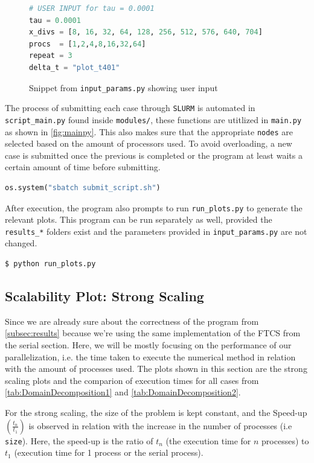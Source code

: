 \begin{figure}[H]
\begin{lstlisting}[language=Python]
# USER INPUT for tau = 0.0001
tau = 0.0001
x_divs = [8, 16, 32, 64, 128, 256, 512, 576, 640, 704]
procs  = [1,2,4,8,16,32,64]
repeat = 3
delta_t = "plot_t401"
\end{lstlisting}
\caption{Snippet from \texttt{input\_params.py} showing user input}
\label{fig:inputparams}
\end{figure}

The process of submitting each case through \texttt{SLURM} is automated in \texttt{script\_main.py} found inside \texttt{modules/}, these functions are utitlized in \texttt{main.py} as shown in \autoref{fig:mainpy}. This also makes sure that the appropriate \texttt{nodes} are selected based on the amount of processors used. To avoid overloading, a new case is submitted once the previous is completed or the program at least waits a certain amount of time before submitting.

\begin{lstlisting}[language=Python]
os.system("sbatch submit_script.sh")
\end{lstlisting}

After execution, the program also prompts to run \texttt{run\_plots.py} to generate the relevant plots. This program can be run separately as well, provided the \texttt{results\_*} folders exist and the parameters provided in \texttt{input\_params.py} are not changed.
\begin{lstlisting}[language=sh]
$ python run_plots.py
\end{lstlisting}

\subsection{Scalability Plot: Strong Scaling}
Since we are already sure about the correctness of the program from \autoref{subsec:results} because we're using the same implementation of the FTCS from the serial section. Here, we will be mostly focusing on the performance of our parallelization, i.e. the time taken to execute the numerical method in relation with the amount of processes used. The plots shown in this section are the strong scaling plots and the comparion of execution times for all cases from \autoref{tab:DomainDecomposition1} and \autoref{tab:DomainDecomposition2}.

For the strong scaling, the size of the problem is kept constant, and the Speed-up$(\frac{t_n}{t_1})$ is observed in relation with the increase in the number of processes (i.e \texttt{size}). Here, the speed-up is the ratio of $t_n$ (the execution time for $n$ processes) to $t_1$ (execution time for 1 process or the serial process).

